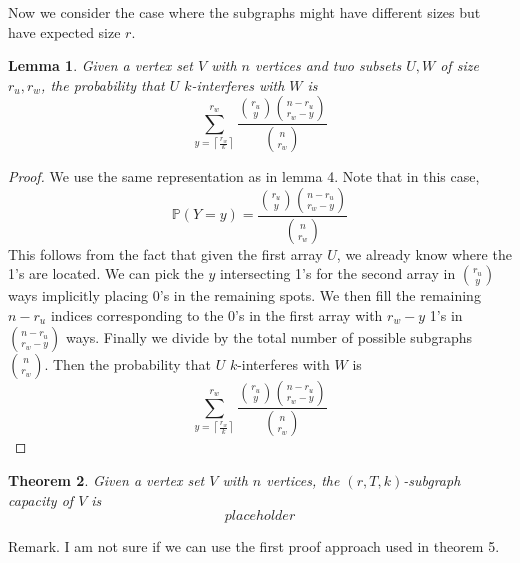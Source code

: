 \documentclass[10pt]{extarticle}
\newtheorem{theorem}{Theorem}
\newtheorem{lemma}[theorem]{Lemma}
\theoremstyle{definition}
\begin{document}
Now we consider the case where the subgraphs might have different sizes but have expected size $r$.

\begin{lemma}
    Given a vertex set $V$ with $n$ vertices and two subsets $U,W$ of size $r_u,r_w$, the probability that $U$ $k$-interferes with $W$ is 
    \begin{equation*}
        \sum_{y = \left\lceil \frac{r_w}{k} \right\rceil}^{r_w}  \frac{\binom{r_u}{y} \binom{n-r_u}{r_w-y}}{\binom{n}{r_w}}
    \end{equation*}
\end{lemma}
\begin{proof}
    We use the same representation as in lemma 4. Note that in this case,
    \begin{equation}
        \mathbb{P}(Y=y) = \frac{\binom{r_u}{y} \binom{n-r_u}{r_w-y}}{\binom{n}{r_w}}
    \end{equation}
    This follows from the fact that given the first array $U$, we already know where the 1's are located. We can pick the $y$ intersecting 1's for the second array in $\binom{r_u}{y}$ ways implicitly placing 0's in the remaining spots. We then fill the remaining $n-r_u$ indices corresponding to the 0's in the first array with $r_w-y$ 1's in $\binom{n-r_u}{r_w-y}$ ways. Finally we divide by the total number of possible subgraphs $\binom{n}{r_w}$. 
    Then the probability that $U$ $k$-interferes with $W$ is 
    \begin{equation}
        \sum_{y = \left\lceil \frac{r_w}{k} \right\rceil}^{r_w}  \frac{\binom{r_u}{y} \binom{n-r_u}{r_w-y}}{\binom{n}{r_w}}
    \end{equation}
\end{proof}

\begin{theorem}
    Given a vertex set $V$ with $n$ vertices, the $(r,T,k)$-subgraph capacity of $V$ is 
    \begin{equation*}
        placeholder
    \end{equation*}
\end{theorem}

Remark. I am not sure if we can use the first proof approach used in theorem 5. 
\end{document}
